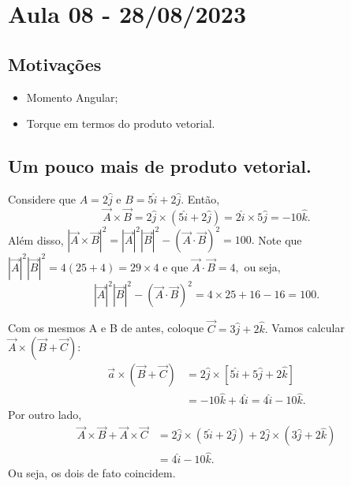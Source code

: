 \documentclass[PhysicsII/physicsII_notes.tex]{subfiles}
\begin{document}
\section{Aula 08 - 28/08/2023}
\subsection{Motivações}
\begin{itemize}
	\item Momento Angular;
	\item Torque em termos do produto vetorial.
\end{itemize}
\subsection{Um pouco mais de produto vetorial.}
\begin{example}
	Considere que \(A = 2 \hat{j}\) e \(B = 5\hat{i} + 2 \hat{j}\). Então,
	\[
		\vec{A} \times{\vec{B}} = 2\hat{j} \times (5\hat{i} + 2\hat{j}) = 2\hat{i}\times 5\hat{j} = -10\hat{k}.
	\]
	Além disso, \(|\vec{A}\times \vec{B}|^{2} = |\vec{A}|^{2}|\vec{B}|^{2} - (\vec{A}\cdot \vec{B})^{2} = 100.\) Note que
	\(|\vec{A}|^{2}|\vec{B}|^{2} = 4 (25+4) = 29\times 4\) e que \(\vec{A}\cdot \vec{B} = 4, \) ou seja,
	\[
		|\vec{A}|^{2}|\vec{B}|^{2} - (\vec{A}\cdot \vec{B})^{2} = 4\times 25 + 16 - 16 = 100.
	\]
\end{example}
\begin{example}
	Com os mesmos A e B de antes, coloque \(\vec{C} = 3\hat{j} + 2 \hat{k}.\) Vamos calcular \(\vec{A}\times(\vec{B} + \vec{C}):\)
	\begin{align*}
		\vec{a}\times(\vec{B}+\vec{C}) & = 2\hat{j} \times [5\hat{i} + 5\hat{j} + 2\hat{k}] \\
		                               & = - 10\hat{k} + 4\hat{i} = 4\hat{i} - 10\hat{k}.
	\end{align*}
	Por outro lado,
	\begin{align*}
		\vec{A} \times \vec{B} + \vec{A} \times \vec{C} & = 2\hat{j}\times(5\hat{i} + 2\hat{j}) + 2\hat{j}\times(3\hat{j}+2\hat{k}) \\
		                                                & = 4\hat{i} - 10\hat{k}.
	\end{align*}
	Ou seja, os dois de fato coincidem.
\end{example}
\end{document}
